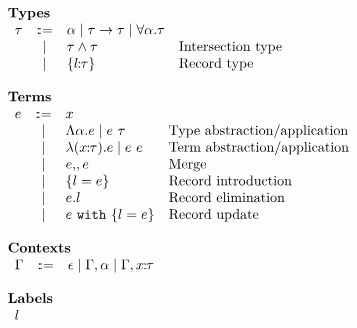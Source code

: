 \[
\begin{array}{l}

    \textbf{Types} \\
    \begin{array}{rcll}
        \ty & \dcoloneq & \alpha \mid \ty \to \ty \mid \forall \alpha. \ty & \\
          & \mid      & \ty \intersects \ty                                  & \text{Intersection type} \\
          & \mid      & \recordtype l \ty                            & \text{Record type}
    \end{array} \\ \\

    \textbf{Terms} \\
    \begin{array}{rcll}
        e & \dcoloneq & x                               & \\
          & \mid      & \Abs \alpha     e \mid \app e \ty & \text{Type abstraction/application} \\
          & \mid      & \abs {\rel x \ty} e \mid \app e e & \text{Term abstraction/application} \\
          & \mid      & e \dcomma e                     & \text{Merge} \\
          & \mid      & \recordintro l e                & \text{Record introduction} \\
          & \mid      & e.l                             & \text{Record elimination} \\
          & \mid      & \recordupdate e l e             & \text{Record update}
    \end{array} \\ \\

    \textbf{Contexts} \\
    \begin{array}{rcl}
        \Gamma & \dcoloneq & \epsilon \mid \Gamma, \alpha \mid \Gamma, \rel x \ty
    \end{array} \\ \\

    \textbf{Labels} \\
    \begin{array}{r}
        l
    \end{array}

\end{array}
\]
